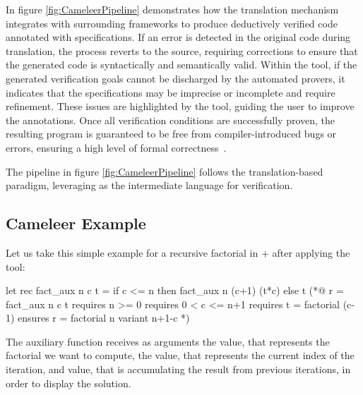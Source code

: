 In figure \ref{fig:CameleerPipeline} demonstrates how the translation mechanism integrates with surrounding frameworks to produce 
deductively verified \ocaml code annotated with \gospel specifications. If an error is detected in the original \ocaml code during 
translation, the process reverts to the source, requiring corrections to ensure that the generated \whyml code is syntactically and 
semantically valid. Within the \whythree tool, if the generated verification goals cannot be discharged by the automated provers, it indicates 
that the specifications may be imprecise or incomplete and require refinement. These issues are highlighted by the tool, guiding the 
user to improve the annotations. Once all verification conditions are successfully proven, the resulting program is guaranteed to 
be free from compiler-introduced bugs or errors, ensuring a high level of formal correctness~\cite{Filliatre11}.


The \cameleer pipeline in figure \ref{fig:CameleerPipeline} follows the translation-based paradigm, 
leveraging \whyml as the intermediate language for verification.

\subsection{Cameleer Example}
\label{subsec:CameleerExample}

Let us take this simple example for a recursive factorial in \ocaml + \gospel after applying the \cameleer tool:

\begin{gospell}
let rec fact_aux n c t =
  if c <= n then fact_aux n (c+1) (t*c) else t
(*@
  r = fact_aux n c t
  requires n >= 0
  requires 0 < c <= n+1
  requires t = factorial (c-1)
  ensures r = factorial n
  variant n+1-c
*)
\end{gospell}

The auxiliary function  receives as arguments the  value, that represents the factorial we want to 
compute, the  value, that represents the current index of the iteration, and  value, that is accumulating 
the result from previous iterations, in order to display the solution.

